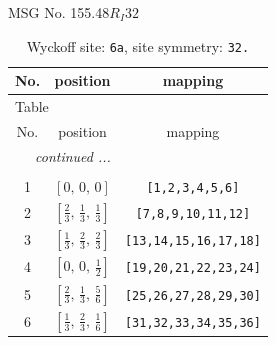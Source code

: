 \documentclass[fleqn,8pt]{jsarticle}
\begin{document}
\setcounter{MaxMatrixCols}{32}

\renewcommand{\tablename}{Table~}
\renewcommand{\figurename}{Figure~}
\begin{center}
\LARGE
MSG No. 155.48\quad$R_{I}32$
\end{center}
\renewcommand{\arraystretch}{1.2}
\begin{longtable}{ccc}
\caption{Wyckoff site: {\tt 6a}, site symmetry: {\tt 32.}}
 \\
 \hline \hline
No. & position & mapping \\ \hline \endfirsthead

\multicolumn{2}{l}{\tablename\ \thetable{}} \\
 \hline \hline
No. & position & mapping \\ \hline \endhead

 \hline \hline
\multicolumn{2}{r}{\footnotesize\it continued ...} \\ \endfoot

 \hline \hline
\multicolumn{2}{r}{} \\ \endlastfoot

1 & $\left[ 0,\, 0,\, 0 \right]$ & {\tt [1,2,3,4,5,6]} \\ \hline
2 & $\left[ \frac{2}{3},\, \frac{1}{3},\, \frac{1}{3} \right]$ & {\tt [7,8,9,10,11,12]} \\ \hline
3 & $\left[ \frac{1}{3},\, \frac{2}{3},\, \frac{2}{3} \right]$ & {\tt [13,14,15,16,17,18]} \\ \hline
4 & $\left[ 0,\, 0,\, \frac{1}{2} \right]$ & {\tt [19,20,21,22,23,24]} \\ \hline
5 & $\left[ \frac{2}{3},\, \frac{1}{3},\, \frac{5}{6} \right]$ & {\tt [25,26,27,28,29,30]} \\ \hline
6 & $\left[ \frac{1}{3},\, \frac{2}{3},\, \frac{1}{6} \right]$ & {\tt [31,32,33,34,35,36]} \\
\end{longtable}
\renewcommand{\arraystretch}{1.2}
\end{document}
